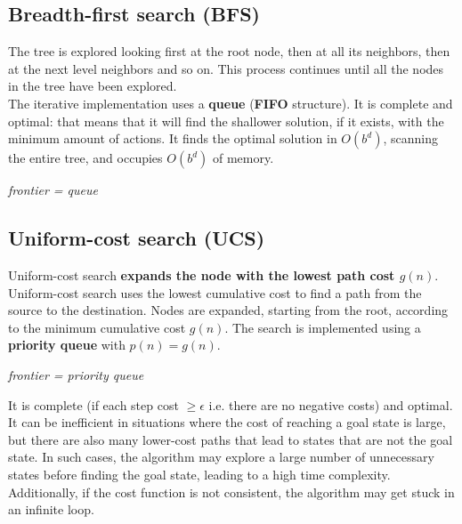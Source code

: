 \documentclass{article}
\begin{document}
\newpage

\subsection{Breadth-first search (BFS)}

The tree is explored looking first at the root node, then at all its neighbors, then at the next level neighbors and so on. This process continues until all the nodes in the tree have been explored. \\

The iterative implementation uses a \textbf{queue} (\textbf{FIFO} structure). It is complete and optimal: that means that it will find the shallower solution, if it exists, with the minimum amount of actions. It finds the optimal solution in $O(b^d)$, scanning the entire tree, and occupies $O(b^d)$ of memory.

\begin{center}
    \textit{frontier = queue}
\end{center}

\newpage

\subsection{Uniform-cost search (UCS)}

Uniform-cost search \textbf{expands the node with the lowest path cost $g(n)$}. \\

Uniform-cost search uses the lowest cumulative cost to find a path from the source to the destination. Nodes are expanded, starting from the root, according to the minimum cumulative cost $g(n)$. The search is implemented using a \textbf{priority queue} with $p(n) = g(n)$.

\begin{center}
    \textit{frontier = priority queue}
\end{center}

It is complete (if each step cost $\geq \epsilon$ i.e. there are no negative costs) and optimal. It can be inefficient in situations where the cost of reaching a goal state is large, but there are also many lower-cost paths that lead to states that are not the goal state. In such cases, the algorithm may explore a large number of unnecessary states before finding the goal state, leading to a high time complexity. Additionally, if the cost function is not consistent, the algorithm may get stuck in an infinite loop. \\
\end{document}
